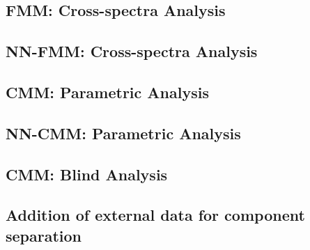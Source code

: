 \documentclass[../../thesis.tex]{subfiles}
\begin{document}
\subsection{FMM: Cross-spectra Analysis}

\subsection{NN-FMM: Cross-spectra Analysis}

\subsection{CMM: Parametric Analysis}

\subsection{NN-CMM: Parametric Analysis}

\subsection{CMM: Blind Analysis}

\subsection{Addition of external data for component separation}
\end{document}
